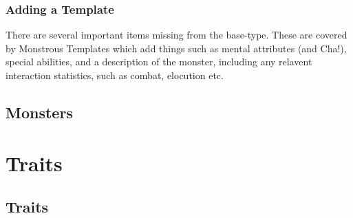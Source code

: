 \documentclass[twoside]{book}
\begin{document}
    

\subsection{Adding a Template}
     There are several important items missing from the
               base-type. These are covered by Monstrous Templates which
               add things such as mental attributes (and Cha!), special
               abilities, and a description of the monster, including any
               relavent interaction statistics, such as combat, elocution
               etc. 
    

\section{Monsters}
    
    

\chapter{Traits}
    
    

\section{Traits}
    
\end{document}
